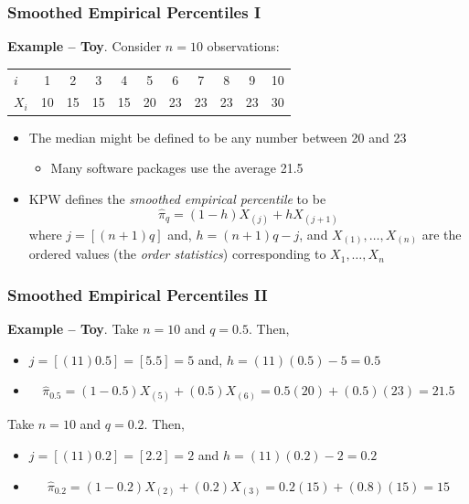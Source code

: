 \documentclass{beamer}
\begin{document}
\begin{frame}[shrink=2]
\frametitle{Smoothed Empirical Percentiles I} \textbf{Example --
Toy}. Consider $n=10$ observations:

\begin{table}[H]\begin{center}
    \begin{tabular}{l|cccccccccc}
    \hline
$i$ &1&2&3&4&5&6&7&8&9&10 \\
$X_i$& 10 &15 &15 &15 &20 &23 &23 &23 &23 &30\\
    \hline
    \end{tabular}\end{center} \end{table} \vspace{4mm}

\begin{itemize}
\item The median might be defined to be any number between 20 and 23
\vspace{4mm}
\begin{itemize}
\item Many software packages use the average 21.5 \end{itemize} \vspace{4mm}
\item KPW defines the \textit{smoothed empirical percentile} to be
$$ \hat{\pi}_q = (1-h) X_{(j)} + h X_{(j+1)}$$ \vspace{2mm}
where $j=[(n+1)q]$ and, $h=(n+1)q-j$, and $X_{(1)}, \ldots, X_{(n)}$
are the ordered values (the \textit{order statistics}) corresponding
to $X_1, \ldots, X_n$ \end{itemize}
\end{frame}

\begin{frame}[shrink=2]
\frametitle{Smoothed Empirical Percentiles II} \textbf{Example --
Toy}. Take $n=10$ and $q=0.5$. Then, \vspace{4mm}

\begin{itemize}

\item $j=[(11)0.5]=[5.5]=5$ and, $h=(11)(0.5)-5=0.5$ \vspace{4mm}

\item
$$ \hat{\pi}_{0.5} = (1-0.5) X_{(5)} + (0.5) X_{(6)} = 0.5 (20) + (0.5)(23) =
21.5$$ \vspace{4mm}
\end{itemize}

Take $n=10$ and $q=0.2$. Then, \vspace{4mm}
\begin{itemize}
\item $j=[(11)0.2]=[2.2]=2$ and  $h=(11)(0.2)-2=0.2$ \vspace{4mm}

\item $$ \hat{\pi}_{0.2} = (1-0.2) X_{(2)} + (0.2) X_{(3)} = 0.2 (15)
+ (0.8)(15) = 15$$
\end{itemize}
\end{frame}
\end{document}
